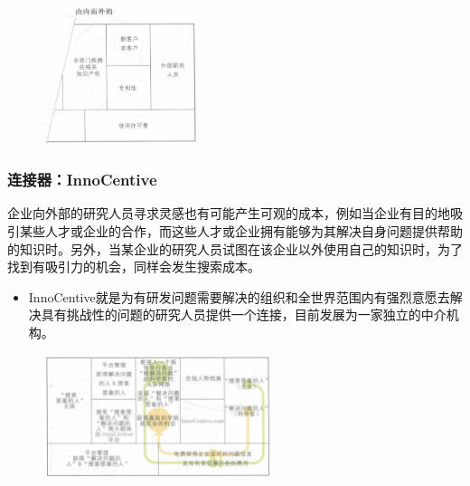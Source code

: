     \begin{figure}[H]
		\centering
        \vspace{-0.5em}
		\includegraphics[width=0.4\textwidth]{img/葛兰素史克.png}
        \vspace{-0.5em}
	\end{figure}

    \subsubsection{连接器：InnoCentive}
    企业向外部的研究人员寻求灵感也有可能产生可观的成本，例如当企业有目的地吸引某些人才或企业的合作，而这些人才或企业拥有能够为其解决自身问题提供帮助的知识时。另外，当某企业的研究人员试图在该企业以外使用自己的知识时，为了找到有吸引力的机会，同样会发生搜索成本。
    \begin{itemize}
        \item InnoCentive就是为有研发问题需要解决的组织和全世界范围内有强烈意愿去解决具有挑战性的问题的研究人员提供一个连接，目前发展为一家独立的中介机构。
    \end{itemize}
    
    \begin{figure}[H]
		\centering
        \vspace{-0.5em}
		\includegraphics[width=0.6\textwidth]{img/InnoCentive.png}
        \vspace{-0.5em}
	\end{figure}

